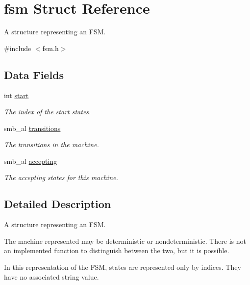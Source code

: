 \hypertarget{structfsm}{\section{fsm \-Struct \-Reference}
\label{structfsm}
}


\-A structure representing an \-F\-S\-M.  




{\ttfamily \#include $<$fsm.\-h$>$}

\subsection*{\-Data \-Fields}
\begin{DoxyCompactItemize}
\item 
\hypertarget{structfsm_a37722a150250e2a5a98e5e0d11e53449}{int \hyperlink{structfsm_a37722a150250e2a5a98e5e0d11e53449}{start}}\label{structfsm_a37722a150250e2a5a98e5e0d11e53449}

\begin{DoxyCompactList}\small\item\em \-The index of the start states. \end{DoxyCompactList}\item 
smb\-\_\-al \hyperlink{structfsm_a22fef7588d41534fabaa8def82aabb2e}{transitions}
\begin{DoxyCompactList}\small\item\em \-The transitions in the machine. \end{DoxyCompactList}\item 
smb\-\_\-al \hyperlink{structfsm_a1b0a524350f2fa9bf19b3e3b35c20ff5}{accepting}
\begin{DoxyCompactList}\small\item\em \-The accepting states for this machine. \end{DoxyCompactList}\end{DoxyCompactItemize}


\subsection{\-Detailed \-Description}
\-A structure representing an \-F\-S\-M. 

\-The machine represented may be deterministic or nondeterministic. \-There is not an implemented function to distinguish between the two, but it is possible.

\-In this representation of the \-F\-S\-M, states are represented only by indices. \-They have no associated string value. 

